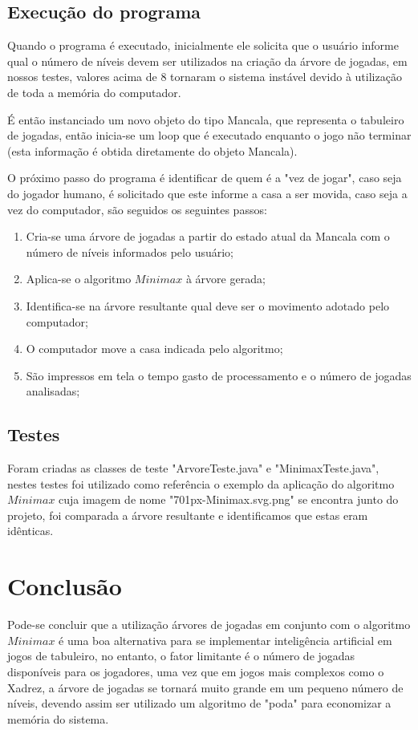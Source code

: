 \documentclass[a4paper,11pt]{article}
\begin{document}
\subsection{Execução do programa}
Quando o programa é executado, inicialmente ele solicita que o usuário informe qual o número de níveis devem ser utilizados na criação da árvore de jogadas, em nossos testes, valores acima de 8 tornaram o sistema instável devido à utilização de toda a memória do computador.

É então instanciado um novo objeto do tipo Mancala, que representa o tabuleiro de jogadas, então inicia-se um loop que é executado enquanto o jogo não terminar (esta informação é obtida diretamente do objeto Mancala).

O próximo passo do programa é identificar de quem é a "vez de jogar", caso seja do jogador humano, é solicitado que este informe a casa a ser movida, caso seja a vez do computador, são seguidos os seguintes passos:

\begin{enumerate}
\item Cria-se uma árvore de jogadas a partir do estado atual da Mancala com o número de níveis informados pelo usuário;
\item Aplica-se o algoritmo $Minimax$ à árvore gerada;
\item Identifica-se na árvore resultante qual deve ser o movimento adotado pelo computador;
\item O computador move a casa indicada pelo algoritmo;
\item São impressos em tela o tempo gasto de processamento e o número de jogadas analisadas;
\end{enumerate}

\subsection{Testes}
Foram criadas as classes de teste "ArvoreTeste.java" e "MinimaxTeste.java", nestes testes foi utilizado como referência o exemplo da aplicação do algoritmo $Minimax$ cuja imagem de nome "701px-Minimax.svg.png" se encontra junto do projeto, foi comparada a árvore resultante e identificamos que estas eram idênticas.

\section{Conclusão}
Pode-se concluir que a utilização árvores de jogadas em conjunto com o algoritmo $Minimax$ é uma boa alternativa para se implementar inteligência artificial em jogos de tabuleiro, no entanto, o fator limitante é o número de jogadas disponíveis para os jogadores, uma vez que em jogos mais complexos como o Xadrez, a árvore de jogadas se tornará muito grande em um pequeno número de níveis, devendo assim ser utilizado um algoritmo de "poda" para economizar a memória do sistema.

\nocite{*}					%
		
		
\end{document}
